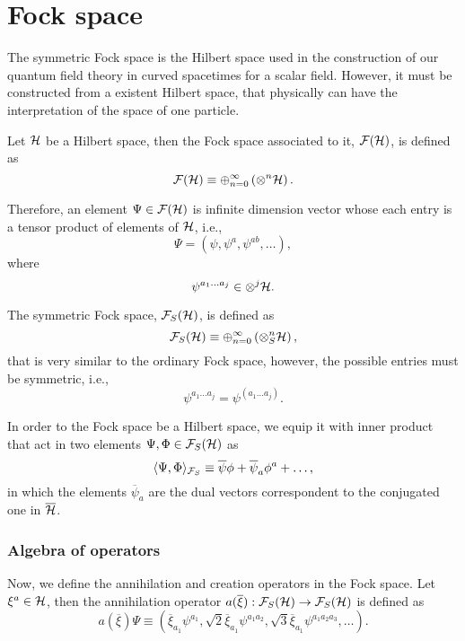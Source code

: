 \appendix

\chapter{Fock space}

The symmetric Fock space is the Hilbert space used in the construction of our quantum field theory in curved spacetimes for a scalar field. However, it must be constructed from a existent Hilbert space, that physically can have the interpretation of the space of one particle.

Let \({\mathcal{H}}\) be a Hilbert space, then the Fock space associated to it, \({\mathcal{F}}({\mathcal{H}})\), is defined as
\begin{equation}
    {\mathcal{F}}({\mathcal{H}})\equiv\oplus_{n=0}^{\infty}\left(\otimes^{n}{\mathcal{H}}\right).
\end{equation}

Therefore, an element \(\Psi\in{\mathcal{F}}({\mathcal{H}})\) is infinite dimension vector whose each entry is a tensor product of elements of \({\mathcal{H}}\), i.e.,
\begin{equation}
    \Psi=\left(\psi,\psi^a,\psi^{ab},\dots\right),
\end{equation}
where
\begin{equation}
    \psi^{a_1\dots a_j}\in\otimes^j{\mathcal{H}}.
\end{equation}

The symmetric Fock space, \({\mathcal{F}}_S({\mathcal{H}})\), is defined as
\begin{equation}
    {\mathcal{F}}_S({\mathcal{H}})\equiv\oplus_{n=0}^{\infty}\left(\otimes^{n}_S{\mathcal{H}}\right),
\end{equation}
that is very similar to the ordinary Fock space, however, the possible entries must be symmetric, i.e.,
\begin{equation}
    \psi^{a_1\dots a_j}=\psi^{(a_1\dots a_j)}.
\end{equation}

In order to the Fock space be a Hilbert space, we equip it with inner product that act in two elements \(\Psi,\Phi\in{\mathcal{F}}_S({\mathcal{H}})\) as
\begin{equation}
    \langle\Psi,\Phi\rangle_{{\mathcal{F}}_S}\equiv\overline{\psi}\phi+\overline{\psi}_a\phi^a+\dots,
\end{equation}
in which the elements \(\overline{\psi}_a\) are the dual vectors correspondent to the conjugated one in \(\overline{{\mathcal{H}}}\).

\subsection*{Algebra of operators}
Now, we define the annihilation and creation operators in the Fock space. Let \(\xi^a\in{\mathcal{H}}\), then the annihilation operator \(a(\overline{\xi}):{\mathcal{F}}_S({\mathcal{H}})\to{\mathcal{F}}_S({\mathcal{H}})\) is defined as
\begin{equation}
    a(\overline{\xi})\Psi\equiv\left(\overline{\xi}_{a_1}\psi^{a_1},\sqrt{2}\overline{\xi}_{a_1}\psi^{a_1a_2},\sqrt{3}\overline{\xi}_{a_1}\psi^{a_1a_2a_3},\dots\right).
\end{equation}

